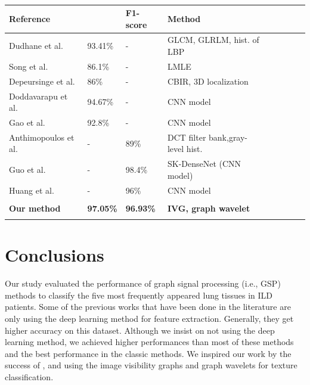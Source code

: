 \documentclass[conference]{IEEEtran}
\begin{document}
\begin{table}[tbh]
  \caption{}
  \label{cm:compare}
  \centering
  \scriptsize
  \begin{tabular}{@{}lllllllll@{}}
  \toprule
  \multirow{1}{0.8cm}{\textbf{Reference}} & \multirow{1}{0.7cm}{\centering{\textbf{Accuracy}}} & \multirow{1}{0.9cm}{\textbf{F1-score}} & \multirow{1}{2cm}{{\textbf{Method}}} \\ \midrule

Dudhane et al. \cite{acc934} & 93.41\% & - & GLCM, GLRLM, hist. of LBP\\ 
Song et al. \cite{acc861} & 86.1\% & - & LMLE \\ 
Depeursinge et al. \cite{acc86} & 86\% & - & CBIR, 3D localization\\ 
Doddavarapu et al. \cite{acc9467} & 94.67\% & - & CNN model\\ 
Gao et al.\cite{acc928} & 92.8\% & - & CNN model\\  
Anthimopoulos et al. \cite{Fscore89} & - & 89\% & DCT filter bank,gray-level hist.\\  
Guo et al. \cite{Fscore984} & - & 98.4\% & SK-DenseNet (CNN model)\\  
Huang et al. \cite{Fscore96} & - & 96\% & CNN model \\  \bottomrule

  \vspace{-0.23cm} \\ 
  \textbf{Our method} & \textbf{97.05\%} & \textbf{96.93\%} & \textbf{IVG, graph wavelet }\\ 
  \vspace{-0.3cm} \\ 
  \bottomrule
   
\end{tabular}
\end{table}



\section{\large{Conclusions}}
Our study evaluated the performance of graph signal processing (i.e., GSP) methods to classify the five most frequently appeared lung tissues in ILD patients. Some of the previous works that have been done in the literature are only using the deep learning method for feature extraction. Generally, they get higher accuracy on this dataset. Although we insist on not using the deep learning method, we achieved higher performances than most of these methods and the best performance in the classic methods. We inspired our work by the success of \cite{chinaIVG}, and \cite{wavelet} using the image visibility graphs and graph wavelets for texture classification.
\end{document}
